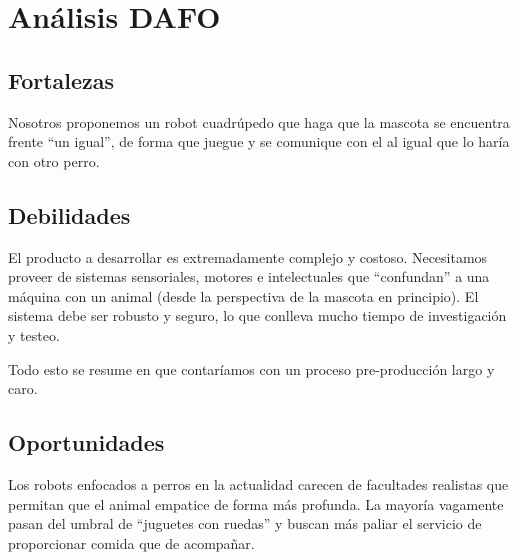 \section{Análisis DAFO}  

\subsection{Fortalezas}

Nosotros proponemos un robot cuadrúpedo que haga que la mascota se encuentra frente ``un igual'', de forma que juegue y se comunique con el al igual que lo haría con otro perro.


\subsection{Debilidades}

El producto a desarrollar es extremadamente complejo y costoso. Necesitamos proveer de sistemas sensoriales, motores e intelectuales que ``confundan'' a una máquina con un animal (desde la perspectiva de la mascota en principio). El sistema debe ser robusto y seguro, lo que conlleva mucho tiempo de investigación y testeo.

Todo esto se resume en que contaríamos con un proceso pre-producción largo y caro.

\subsection{Oportunidades}

Los robots enfocados a perros en la actualidad carecen de facultades realistas que permitan que el animal empatice de forma más profunda. La mayoría vagamente pasan del umbral de ``juguetes con ruedas'' y buscan más paliar el servicio de proporcionar comida que de acompañar.


